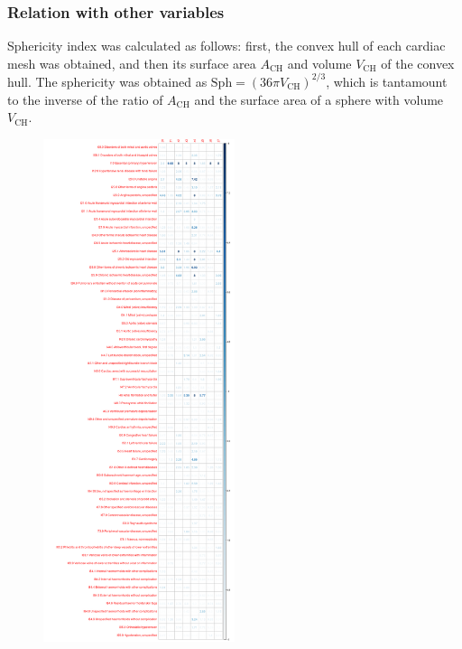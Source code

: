 \documentclass[fleqn,10pt]{wlscirep}
\begin{document}
\subsubsection{Relation with other variables}

Sphericity index was calculated as follows: first, the convex hull of each cardiac mesh was obtained, and then its surface area $A_{\text{CH}}$ and volume $V_{\text{CH}}$ of the convex hull. The sphericity was obtained as $\text{Sph}=(36\pi V_{\text{CH}})^{2/3}$, which is tantamount to the inverse of the ratio of $A_{\text{CH}}$ and the surface area of a sphere with volume $V_{\text{CH}}$.

\begin{figure}
\includegraphics[width=0.5\textwidth]{figs/diseases/experiment_1_health_outcome_t-test}

\end{figure}
\end{document}
